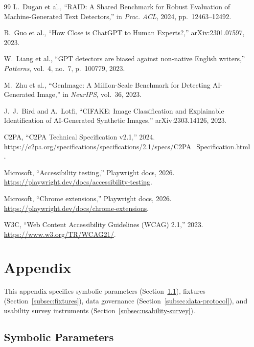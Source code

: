 \documentclass[12pt, titlepage]{article}
\begin{document}
\begin{thebibliography}{99}
L.~Dugan et al., ``RAID: A Shared Benchmark for Robust Evaluation of Machine-Generated Text Detectors,'' in \emph{Proc. ACL}, 2024, pp.~12463--12492.

B.~Guo et al., ``How Close is ChatGPT to Human Experts?,'' arXiv:2301.07597, 2023.

W.~Liang et al., ``GPT detectors are biased against non-native English writers,'' \emph{Patterns}, vol.~4, no.~7, p.~100779, 2023.

M.~Zhu et al., ``GenImage: A Million-Scale Benchmark for Detecting AI-Generated Image,'' in \emph{NeurIPS}, vol.~36, 2023.

J.~J.~Bird and A.~Lotfi, ``CIFAKE: Image Classification and Explainable Identification of AI-Generated Synthetic Images,'' arXiv:2303.14126, 2023.

C2PA, ``C2PA Technical Specification v2.1,'' 2024. \url{https://c2pa.org/specifications/specifications/2.1/specs/C2PA_Specification.html}.

Microsoft, ``Accessibility testing,'' Playwright docs, 2026. \url{https://playwright.dev/docs/accessibility-testing}.

Microsoft, ``Chrome extensions,'' Playwright docs, 2026. \url{https://playwright.dev/docs/chrome-extensions}.

W3C, ``Web Content Accessibility Guidelines (WCAG) 2.1,'' 2023. \url{https://www.w3.org/TR/WCAG21/}.

\end{thebibliography}
\endgroup

\newpage

\section{Appendix}\label{sec:appendix}

This appendix specifies symbolic parameters (Section~\ref{subsec:symbolic-params}), fixtures (Section~\ref{subsec:fixtures}), data governance (Section~\ref{subsec:data-protocol}), and usability survey instruments (Section~\ref{subsec:usability-survey}).

\subsection{Symbolic Parameters}\label{subsec:symbolic-params}
\end{document}
